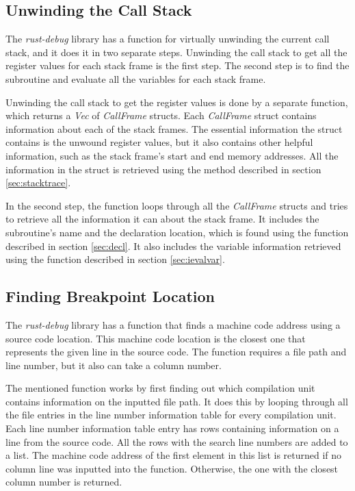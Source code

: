 \subsection{Unwinding the Call Stack}
The \emph{rust-debug} library has a function for virtually unwinding the current call stack, and it does it in two separate steps.
Unwinding the call stack to get all the register values for each stack frame is the first step.
The second step is to find the subroutine and evaluate all the variables for each stack frame.


Unwinding the call stack to get the register values is done by a separate function, which returns a \emph{Vec} of \emph{CallFrame} structs.
Each \emph{CallFrame} struct contains information about each of the stack frames.
The essential information the struct contains is the unwound register values, but it also contains other helpful information, such as the stack frame's start and end memory addresses.
All the information in the struct is retrieved using the method described in section \ref{sec:stacktrace}.


In the second step, the function loops through all the \emph{CallFrame} structs and tries to retrieve all the information it can about the stack frame.
It includes the subroutine's name and the declaration location, which is found using the function described in section \ref{sec:decl}.
It also includes the variable information retrieved using the function described in section \ref{sec:ievalvar}.



\subsection{Finding Breakpoint Location}
The \emph{rust-debug} library has a function that finds a machine code address using a source code location.
This machine code location is the closest one that represents the given line in the source code.
The function requires a file path and line number, but it also can take a column number.


The mentioned function works by first finding out which compilation unit contains information on the inputted file path.
It does this by looping through all the file entries in the line number information table for every compilation unit.
Each line number information table entry has rows containing information on a line from the source code.
All the rows with the search line numbers are added to a list.
The machine code address of the first element in this list is returned if no column line was inputted into the function.
Otherwise, the one with the closest column number is returned.



